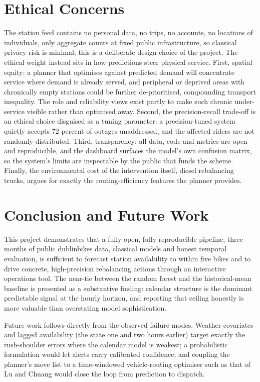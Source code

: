 \documentclass[conference]{IEEEtran}
\begin{document}
\section{Ethical Concerns}
The station feed contains no personal data, no trips, no accounts, no locations of individuals, only aggregate counts at fixed public infrastructure, so classical privacy risk is minimal; this is a deliberate design choice of the project. The ethical weight instead sits in how predictions steer physical service. First, spatial equity: a planner that optimises against predicted demand will concentrate service where demand is already served, and peripheral or deprived areas with chronically empty stations could be further de-prioritised, compounding transport inequality. The role and reliability views exist partly to make such chronic under-service visible rather than optimised away. Second, the precision-recall trade-off is an ethical choice disguised as a tuning parameter: a precision-tuned system quietly accepts 72 percent of outages unaddressed, and the affected riders are not randomly distributed. Third, transparency: all data, code and metrics are open and reproducible, and the dashboard surfaces the model's own confusion matrix, so the system's limits are inspectable by the public that funds the scheme. Finally, the environmental cost of the intervention itself, diesel rebalancing trucks, argues for exactly the routing-efficiency features the planner provides.

\section{Conclusion and Future Work}
This project demonstrates that a fully open, fully reproducible pipeline, three months of public dublinbikes data, classical models and honest temporal evaluation, is sufficient to forecast station availability to within five bikes and to drive concrete, high-precision rebalancing actions through an interactive operations tool. The near-tie between the random forest and the historical-mean baseline is presented as a substantive finding: calendar structure is the dominant predictable signal at the hourly horizon, and reporting that ceiling honestly is more valuable than overstating model sophistication.

Future work follows directly from the observed failure modes. Weather covariates and lagged availability (the state one and two hours earlier) target exactly the rush-shoulder errors where the calendar model is weakest; a probabilistic formulation would let alerts carry calibrated confidence; and coupling the planner's move list to a time-windowed vehicle-routing optimiser such as that of Lu and Chuang \cite{lu2024heuristic} would close the loop from prediction to dispatch.



\end{document}
